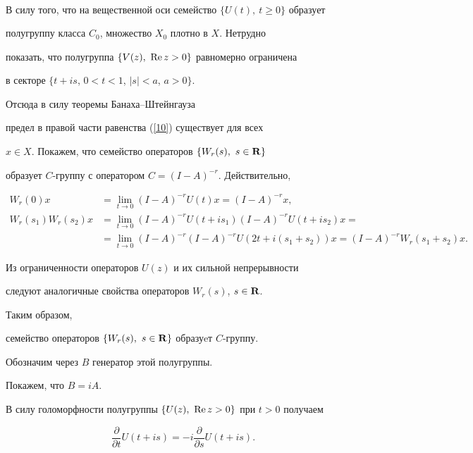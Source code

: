 \begin{pf}
\begin{multline*}
\end{multline*}


В силу того, что на вещественной оси семейство $\{U(t),\ t\geq0\}$ образует 


полугруппу класса $C_0$, множество $X_0$ плотно в $X$. Нетрудно 


показать, что полугруппа $\{V(z),\ \operatorname{Re} z>0\}$ равномерно ограничена


в секторе $\{t+is$, $0<t<1$, $|s|<a$, $a>0\}$. 


Отсюда в силу теоремы Банаха--Штейнгауза


предел в правой части равенства (\ref{10}) существует для всех 


$x \in X$. Покажем, что семейство операторов $\{W_r(s),\ s\in \bold R\}$ 


образует $C$-группу с оператором $C=(I-A)^{-r}$.  Действительно,


\begin{align*}


W_r(0)x&=\lim\limits_{t\to 0}(I-A)^{-r}U(t)x=(I-A)^{-r}x, \\


%


W_r(s_1)W_r(s_2)x&=


\lim\limits_{t\to 0}(I-A)^{-r}U(t+is_1)(I-A)^{-r}U(t+is_2)x= \\


%


&=\lim_{t\to 0}(I-A)^{-r}(I-A)^{-r}U(2t+i(s_1+s_2))x=(I-A)^{-r}W_r(s_1+s_2)x.


\end{align*}


Из ограниченности операторов $U(z)$ и их сильной непрерывности


следуют аналогичные свойства операторов $W_r(s)$, $s\in \bold R$.


Таким образом,


семейство операторов $\{W_r(s),\ s\in \bold R\}$ образуeт $C$-группу.


Обозначим через $B$ генератор этой полугруппы.


Покажем, что $B=iA$.


В силу голоморфности полугруппы $\{U(z),\ \re z>0\}$ при $t>0$ получаем


\begin{equation}\label{22}


\frac{\partial}{\partial t}U(t+is)=-i\frac{\partial}{\partial s}U(t+is).


\end{equation}



\end{pf}
